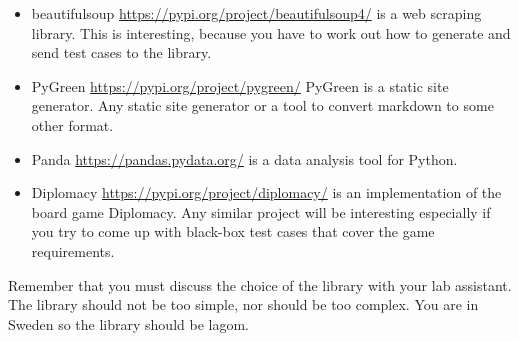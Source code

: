 \documentclass[a4paper]{article}
\begin{document}
\begin{itemize}
\item beautifulsoup \url{https://pypi.org/project/beautifulsoup4/}
  is a web scraping library. This is interesting, because you have to
  work out how to generate and send test cases to the library.
\item PyGreen \url{https://pypi.org/project/pygreen/} PyGreen is a
  static site generator. Any static site generator or a tool to
  convert markdown to some other format. 
\item Panda \url{https://pandas.pydata.org/} is a data analysis tool
  for Python.
\item Diplomacy \url{https://pypi.org/project/diplomacy/} is an
  implementation of the board game Diplomacy. Any similar project will
  be interesting especially if you try to come up with black-box test
  cases that cover the game requirements.
\end{itemize}

Remember that you must discuss the choice of the library with your lab
assistant. The library should not be too simple, nor should be too
complex. You are in Sweden so the library should be lagom.
\end{document}
